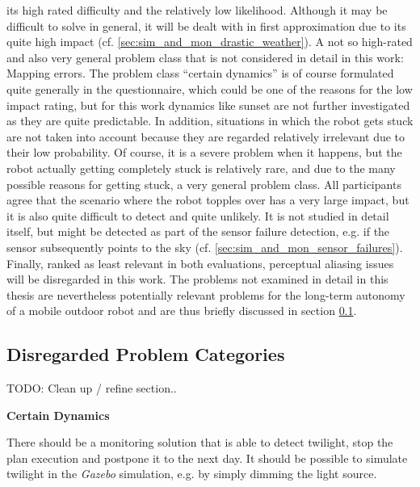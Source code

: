 \documentclass[english, master, utf8]{base/thesis_KBS}
\begin{document}
its high rated difficulty and the relatively low likelihood. Although it may be difficult to solve in general, it will be dealt with in first approximation due to its quite high
impact (cf. \ref{sec:sim_and_mon_drastic_weather}).\newline
A not so high-rated and also very general problem class that is not considered in detail in this work: Mapping errors. The problem class ``certain dynamics'' is of course formulated
quite generally in the questionnaire, which could be one of the reasons for the low impact rating, but for this work dynamics like sunset are not further investigated as they are
quite predictable. In addition, situations in which the robot gets stuck are not taken into account because they are regarded relatively irrelevant due to their low probability.
Of course, it is a severe problem when it happens, but the robot actually getting completely stuck is relatively rare, and due to the many possible reasons for getting stuck, 
a very general problem class. All participants agree that the scenario where the robot topples over has a very large impact, but it is also quite difficult to detect and quite
unlikely. It is not studied in detail itself, but might be detected as part of the sensor failure detection, e.g. if the sensor subsequently points to the sky (cf.
\ref{sec:sim_and_mon_sensor_failures}). Finally, ranked as least relevant in both evaluations, perceptual aliasing issues will be disregarded in this work. The problems not examined in
detail in this thesis are nevertheless potentially relevant problems for the long-term autonomy of a mobile outdoor robot and are thus briefly discussed in section 
\ref{sec:lta_problems_not_considered}.

\pagebreak

\subsection{Disregarded Problem Categories}

\label{sec:lta_problems_not_considered}

TODO: Clean up / refine section..\newline

\noindent
\textbf{Certain Dynamics}\newline

\noindent
There should be a monitoring solution that is able to detect twilight, stop the plan execution and postpone it to the next day.
It should be possible to simulate twilight in the \textit{Gazebo} simulation, e.g. by simply dimming the light source.\newline
\end{document}
